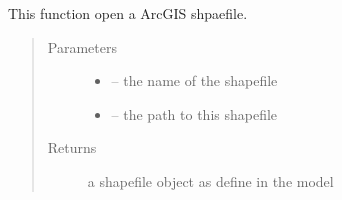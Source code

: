 \documentclass[letterpaper,10pt,english]{sphinxmanual}
\begin{document}

\begin{fulllineitems}
\label{\detokenize{index:src.substrate.open_shp}}
This function open a ArcGIS shpaefile.
\begin{quote}\begin{description}
\item[{Parameters}] \leavevmode\begin{itemize}
\item {} 
 -- the name of the shapefile

\item {} 
 -- the path to this shapefile

\end{itemize}

\item[{Returns}] \leavevmode
a shapefile object as define in the model

\end{description}\end{quote}

\end{fulllineitems}

\end{document}
